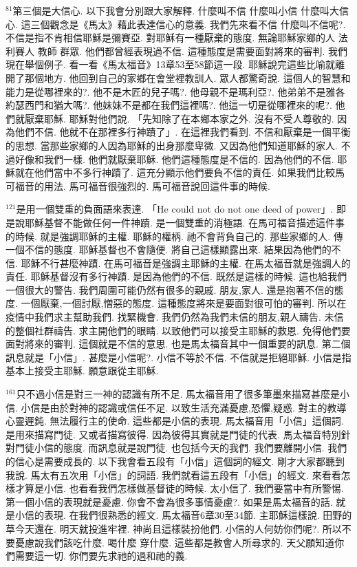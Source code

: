 \documentclass{book}
\begin{document}
$^{81}$第三個是大信心.
以下我會分別跟大家解釋.
什麼叫不信 什麼叫小信 什麼叫大信心.
這三個觀念是《馬太》藉此表達信心的意義.
我們先來看不信 什麼叫不信呢?.
不信是指不肯相信耶穌是彌賽亞.
對耶穌有一種厭棄的態度.
無論耶穌家鄉的人 法利賽人 教師 群眾.
他們都曾經表現過不信.
這種態度是需要面對將來的審判.
我們現在舉個例子.
看一看《馬太福音》13章53至58節這一段.
耶穌說完這些比喻就離開了那個地方.
他回到自己的家鄉在會堂裡教訓人.
眾人都驚奇說.
這個人的智慧和能力是從哪裡來的?.
他不是木匠的兒子嗎?.
他母親不是瑪利亞?.
他弟弟不是雅各約瑟西門和猶大嗎?.
他妹妹不是都在我們這裡嗎?.
他這一切是從哪裡來的呢?.
他們就厭棄耶穌.
耶穌對他們說.
「先知除了在本鄉本家之外.
沒有不受人尊敬的.
因為他們不信.
他就不在那裡多行神蹟了」.
在這裡我們看到.
不信和厭棄是一個平衡的思想.
當那些家鄉的人因為耶穌的出身那麼卑微.
又因為他們知道耶穌的家人.
不過好像和我們一樣.
他們就厭棄耶穌.
他們這種態度是不信的.
因為他們的不信.
耶穌就在他們當中不多行神蹟了.
這充分顯示他們要負不信的責任.
如果我們比較馬可福音的用法.
馬可福音很強烈的.
馬可福音說回這件事的時候.

$^{121}$是用一個雙重的負面語來表達.
「He could not do not one deed of power」.
即是說耶穌基督不能做任何一件神蹟.
是一個雙重的消極語.
在馬可福音描述這件事的時候.
就是強調耶穌的主權.
耶穌的權柄.
祂不會背負自己的.
那些家鄉的人.
傳一個不信的態度.
耶穌基督也不會隨便.
將自己這樣顯露出來.
結果因為他們的不信.
耶穌不行甚麼神蹟.
在馬可福音是強調主耶穌的主權.
在馬太福音就是強調人的責任.
耶穌基督沒有多行神蹟.
是因為他們的不信.
既然是這樣的時候.
這也給我們一個很大的警告.
我們周圍可能仍然有很多的親戚.
朋友,家人.
還是抱著不信的態度.
一個厭棄,一個討厭,憎惡的態度.
這種態度將來是要面對很可怕的審判.
所以在疫情中我們求主幫助我們.
找緊機會.
我們仍然為我們未信的朋友,親人禱告.
未信的整個社群禱告.
求主開他們的眼睛.
以致他們可以接受主耶穌的救恩.
免得他們要面對將來的審判.
這個就是不信的意思.
也是馬太福音其中一個重要的訊息.
第二個訊息就是「小信」.
甚麼是小信呢?.
小信不等於不信.
不信就是拒絕耶穌.
小信是指基本上接受主耶穌.
願意跟從主耶穌.

$^{161}$只不過小信是對三一神的認識有所不足.
馬太福音用了很多筆墨來描寫甚麼是小信.
小信是由於對神的認識或信任不足.
以致生活充滿憂慮,恐懼,疑惑.
對主的教導心靈遲鈍.
無法履行主的使命.
這些都是小信的表現.
馬太福音用「小信」這個詞.
是用來描寫門徒.
又或者描寫彼得.
因為彼得其實就是門徒的代表.
馬太福音特別針對門徒小信的態度.
而訊息就是說門徒.
也包括今天的我們.
我們要離開小信.
我們的信心是需要成長的.
以下我會看五段有「小信」這個詞的經文.
剛才大家都聽到我說.
馬太有五次用「小信」的詞語.
我們就看這五段有「小信」的經文.
來看看怎樣才算是小信.
也看看我們怎樣做基督徒的時候.
太小信了.
我們要當中有所警惕.
第一個小信的表現就是憂慮.
你會不會為很多事情憂慮?.
如果是馬太福音的話.
就是小信的表現.
在我們很熟悉的經文.
馬太福音6章30至34節.
主耶穌這樣說.
田野的草今天還在.
明天就投進牢裡.
神尚且這樣裝扮他們.
小信的人何妨你們呢?.
所以不要憂慮說我們該吃什麼.
喝什麼 穿什麼.
這些都是教會人所尋求的.
天父願知道你們需要這一切.
你們要先求祂的過和祂的義.
\end{document}
